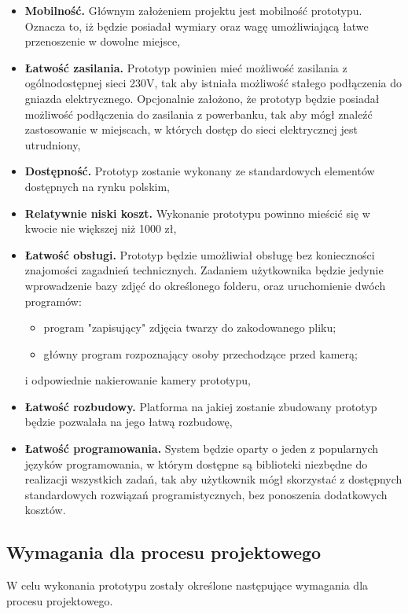 \documentclass[a4paper,12pt,reqno]{article}
\begin{document}
\begin{itemize}
	\item \textbf{Mobilność.} Głównym założeniem projektu jest mobilność prototypu. Oznacza to, iż będzie posiadał wymiary oraz wagę umożliwiającą łatwe przenoszenie w dowolne miejsce,
	\item \textbf{Łatwość zasilania.} Prototyp powinien mieć możliwość zasilania z ogólnodostępnej sieci 230V, tak aby istniała możliwość stałego podłączenia do gniazda elektrycznego. Opcjonalnie założono, że prototyp będzie posiadał możliwość podłączenia do zasilania z powerbanku, tak aby mógł znaleźć zastosowanie w miejscach, w których dostęp do sieci elektrycznej jest utrudniony,
	\item \textbf{Dostępność.} Prototyp zostanie wykonany ze standardowych elementów dostępnych na rynku polskim,
	\item \textbf{Relatywnie niski koszt.} Wykonanie prototypu powinno mieścić się w kwocie nie większej niż 1000 zł,
	\item \textbf{Łatwość obsługi.} Prototyp będzie umożliwiał obsługę bez konieczności znajomości zagadnień technicznych. Zadaniem użytkownika będzie jedynie wprowadzenie bazy zdjęć do określonego folderu, oraz uruchomienie dwóch programów:
		\begin{itemize}
			\item program "zapisujący" zdjęcia twarzy do zakodowanego pliku;
			\item główny program rozpoznający osoby przechodzące przed kamerą;
		\end{itemize}
	i odpowiednie nakierowanie kamery prototypu,
	\item \textbf{Łatwość rozbudowy.} Platforma na jakiej zostanie zbudowany prototyp będzie pozwalała na jego łatwą rozbudowę,
	\item \textbf{Łatwość programowania.} System będzie oparty o jeden z popularnych języków programowania, w którym dostępne są biblioteki niezbędne do realizacji wszystkich zadań, tak aby użytkownik mógł skorzystać z dostępnych standardowych rozwiązań programistycznych, bez ponoszenia dodatkowych kosztów.
\end{itemize}

\subsection{Wymagania dla procesu projektowego}

W celu wykonania prototypu zostały określone następujące wymagania dla procesu projektowego.
\end{document}
